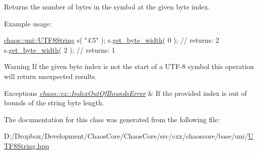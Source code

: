 Returns the number of bytes in the symbol at the given byte index. 

Example usage\+:


\begin{DoxyCode}
\hyperlink{classchaos_1_1uni_1_1_u_t_f8_string}{chaos::uni::UTF8String} s( \textcolor{stringliteral}{"£5"} );
s.\hyperlink{classchaos_1_1uni_1_1_u_t_f8_string_ae0865f2a2dc39b4a9c3a7c968123f8fe}{get\_byte\_width}( 0 ); \textcolor{comment}{// returns: 2}
s.\hyperlink{classchaos_1_1uni_1_1_u_t_f8_string_ae0865f2a2dc39b4a9c3a7c968123f8fe}{get\_byte\_width}( 2 ); \textcolor{comment}{// returns: 1}
\end{DoxyCode}


\begin{DoxyWarning}{Warning}
If the given byte index is not the start of a U\+T\+F-\/8 symbol this operation will return unexpected results.
\end{DoxyWarning}

\begin{DoxyExceptions}{Exceptions}
{\em \hyperlink{classchaos_1_1ex_1_1_index_out_of_bounds_error}{chaos\+::ex\+::\+Index\+Out\+Of\+Bounds\+Error}} & If the provided index is out of bounds of the string byte length. \\
\hline
\end{DoxyExceptions}


The documentation for this class was generated from the following file\+:\begin{DoxyCompactItemize}
\item 
D\+:/\+Dropbox/\+Development/\+Chaos\+Core/\+Chaos\+Core/src/cxx/chaoscore/base/uni/\hyperlink{_u_t_f8_string_8hpp}{U\+T\+F8\+String.\+hpp}\end{DoxyCompactItemize}
